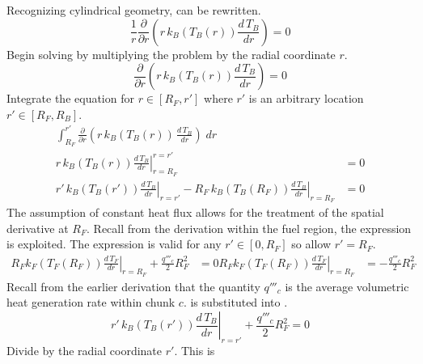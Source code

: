       Recognizing cylindrical geometry,  can be rewritten.
      \begin{equation}
        \label{eq:tb_heat_conduction}
        \frac{1}{r} \frac{\partial}{\partial r} \left(
          r \, k_B(T_B(r)) \frac{d \, T_B}{dr} \right) = 0
      \end{equation}
      Begin solving  by multiplying the problem by
      the radial coordinate $r$.
      \begin{equation}
        \frac{\partial}{\partial r} \left( r \, k_B(T_B(r)) \frac{d \, T_B}{dr}
          \right) = 0
      \end{equation}
      Integrate the equation for $r \in[R_F,r']$ where $r'$ is an arbitrary
      location $r' \in [R_F,R_B]$.
      \begin{align}
        \int_{R_F}^{r'} \frac{\partial}{\partial r} \left( r\, k_B(T_B(r)) \, 
          \frac{d\,T_B}{dr} \right) \; dr \\
        \left. r\, k_B(T_B(r)) \frac{d\,T_B}{dr} \right|_{r=R_F}^{r=r'} &= 0 \\
        \label{eq:tf_first_integral}
        \left. r' \, k_B(T_B(r')) \frac{d\,T_B}{dr} \right|_{r=r'} - 
          \left. R_F \, k_B(T_B(R_F)) \frac{d\,T_B}{dr} \right|_{r=R_F} &= 0
      \end{align}
      The assumption of constant heat flux allows for the treatment of the
      spatial derivative at $R_F$. Recall from the derivation within the fuel
      region, the expression  is exploited. The expression is
      valid for any $r' \in [0,R_F]$ so allow $r'=R_F$.
      \begin{align}
        \left. R_F k_F(T_F(R_F)) \frac{d\,T_F}{dr} \right|_{r=R_F} + 
          \frac{q'''_c}{2} R_F^2 &= 0
        \label{eq:surface_relation}
        \left. R_F k_F(T_F(R_F)) \frac{d\,T_F}{dr} \right|_{r=R_F} &= 
          - \frac{q'''_c}{2} R_F^2
      \end{align}
      Recall from the earlier derivation that the quantity $q'''_c$ is the
      average volumetric heat generation rate within chunk $c$.
       is substituted into
      .
      \begin{equation}
        \label{eq:tf_first_bc}
        \left. r' \, k_B(T_B(r')) \frac{d\,T_B}{dr} \right|_{r=r'} +
          \frac{q'''_c}{2} R_F^2 = 0
      \end{equation}
      Divide  by the radial coordinate $r'$. This is
